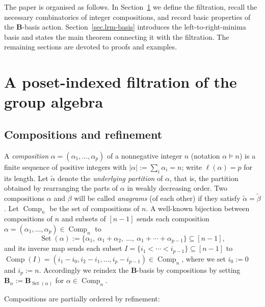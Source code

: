 \documentclass[submission]{FPSAC2026}
\newcommand{\Comp}{\operatorname{Comp}}
\begin{document}
The paper is organised as follows.  In Section~\ref{sec.filtration} we
define the filtration, recall the necessary combinatorics of integer
compositions, and record basic properties of the \(\mathbf{B}\)-basis
action. Section~\ref{sec.lrm-basis} introduces the left-to-right-minima basis
and states the main theorem connecting it with the filtration.
The remaining sections are devoted to proofs and examples.

\section{A poset-indexed filtration of the group algebra}
\label{sec.filtration}

\subsection{Compositions and refinement}
\label{sec:compositions}

A \emph{composition} \(\alpha=(\alpha_1,\dots,\alpha_p)\) of a nonnegative
integer \(n\) (notation \(\alpha\vDash n\)) is a finite sequence of positive
integers with \(|\alpha|:=\sum_i\alpha_i=n\); write \(\ell(\alpha)=p\) for
its length.
Let $\widetilde{\alpha}$ denote the \emph{underlying partition} of $\alpha$, that is, the partition obtained by rearranging the parts of $\alpha$ in weakly decreasing order.
Two compositions $\alpha$ and $\beta$ will be called \emph{anagrams}
(of each other) if they satisfy
$\widetilde{\alpha} =\widetilde{\beta}$.
Let \(\Comp_n\) be the set of compositions of \(n\).
A well-known bijection between compositions of \(n\) and subsets of
\([n-1]\) sends each composition \(\alpha=(\alpha_1,\dots,\alpha_p)
\in \Comp_n\) to
\[
\operatorname{Set}(\alpha)
 := \{\alpha_1,\ \alpha_1+\alpha_2,\ \dots,\ \alpha_1+\cdots+\alpha_{p-1}\}\subseteq[n-1],
\]
and its inverse map sends each subset \(I=\{i_1<\cdots<i_{p-1}\}\subseteq[n-1]\) to
\(\operatorname{Comp}(I)=(i_1-i_0,i_2-i_1,\dots,i_p-i_{p-1})\in\Comp_n\),
where we set \(i_0 := 0\) and \(i_p := n\).
Accordingly we reindex the \(\mathbf{B}\)-basis by compositions by
setting
\(\mathbf{B}_\alpha:=\mathbf{B}_{\operatorname{Set}(\alpha)}\) for
\(\alpha\in\Comp_n\).

Compositions are partially ordered by refinement:
\end{document}
